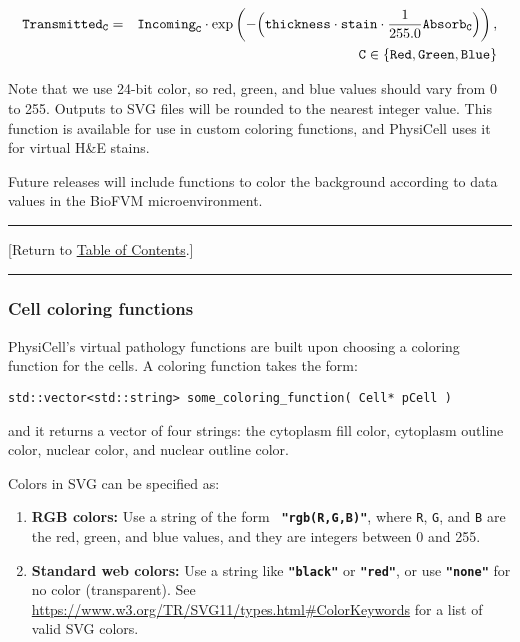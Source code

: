 \documentclass[12pt]{article}
\newcommand{\braces}[1]{\left\{#1\right\}}
\newcommand{\beqa}{\begin{eqnarray}}
\newcommand{\eeqa}{\end{eqnarray}}
\renewcommand{\v}{\verb}
\newcommand{\smallcode}[1]{\textbf{\texttt{#1}}}
\newcommand{\blue}[1]{\textcolor{blue}{#1}}
\newcommand{\DONE}{}%
\newcommand{\TOClink}{\begin{center}\hrule\vskip-10pt\phantom{.}\hfill[Return to \hyperlink{TOC}{Table of Contents}.]\hfill\phantom{.}\vskip3pt\hrule\end{center}}
\begin{document}
\begin{enumerate}
\beqa
\texttt{Transmitted}_\texttt{C} & = & \texttt{Incoming}_\texttt{C} 
\cdot 
\exp\left( 
 -\Bigl( \texttt{thickness} 
\cdot \texttt{stain} \cdot \frac{1}{255.0} \texttt{Absorb}_\texttt{C} \Bigr) \right), 
\nonumber \\
 && 
 \phantom{ } \hfill 
\texttt{C} \in \braces{ \texttt{Red}, \texttt{Green}, \texttt{Blue} }
\eeqa

Note that we use 24-bit color, so red, green, and blue values should vary from 
0 to 255. Outputs to SVG files will be rounded to the nearest integer value. 
This function is available for use in custom coloring functions, and PhysiCell 
uses it for virtual H\&E stains. 

\end{enumerate}

Future releases will include functions to color the background according to data values in 
the BioFVM microenvironment. 

\TOClink

\subsubsection{Cell coloring functions \DONE}
\label{sec:Pathology_Coloring}

PhysiCell's virtual pathology functions are built upon choosing a coloring 
function for the cells. A coloring function takes the form: 
%
\begin{verbatim}
std::vector<std::string> some_coloring_function( Cell* pCell )
\end{verbatim}
%
and it returns a vector of four strings: the cytoplasm fill color, cytoplasm outline color, 
nuclear color, and nuclear outline color. 

Colors in SVG can be specified as: 
\begin{enumerate}
\item 
\textbf{RGB colors:} Use a string of the form 
\smallcode{ "rgb(R,G,B)"}, where \v|R|, \v|G|, and \v|B| are the red, 
green, and blue values, and they are integers between 0 and 255. 

\item 
\textbf{Standard web colors:} Use a string like \smallcode{"black"} or 
\smallcode{"red"}, or use \smallcode{"none"} for no color (transparent). 
See 
\href{https://www.w3.org/TR/SVG11/types.html#ColorKeywords}{https://www.w3.org/TR/SVG11/types.html\#ColorKeywords} for a 
list of valid SVG colors. 

\end{enumerate}
\end{document}
